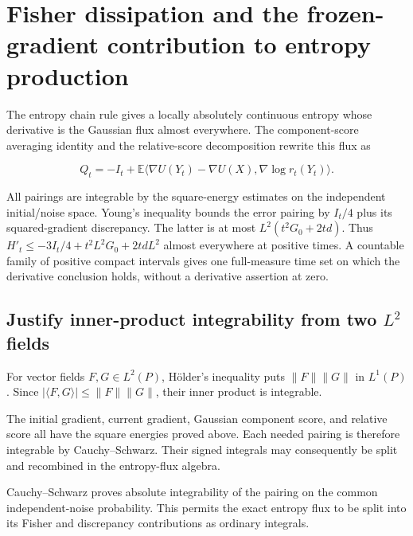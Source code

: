 \documentclass[11pt,a4paper]{report}
\begin{document}
\section{\texorpdfstring{Fisher dissipation and the frozen-gradient contribution to entropy production}{Fisher dissipation and the frozen-gradient contribution to entropy production}}
\label{proof-module-UnadjustedLangevin-LSI-GaussianEntropyProduction-lean}


The entropy chain rule gives a locally absolutely continuous entropy whose derivative is the Gaussian flux almost everywhere. The component-score averaging identity and the relative-score decomposition rewrite this flux as

\[Q_t=-I_t+\mathbb E\langle\nabla U(Y_t)-\nabla U(X),\nabla\log r_t(Y_t)\rangle.\]

All pairings are integrable by the square-energy estimates on the independent initial/\allowbreak{}noise space. Young's inequality bounds the error pairing by \(I_t/4\) plus its squared-gradient discrepancy. The latter is at most \(L^2(t^2G_0+2td)\). Thus \(H'_t\le-3I_t/4+t^2L^2G_0+2tdL^2\) almost everywhere at positive times. A countable family of positive compact intervals gives one full-measure time set on which the derivative conclusion holds, without a derivative assertion at zero.

\subsection{\texorpdfstring{Justify inner-product integrability from two \(L^2\) fields}{Justify inner-product integrability from two L² fields}}
\label{report-step-UnadjustedLangevin-LSI-GaussianEntropyProduction-lean-1}


For vector fields \(F,G\in L^2(P)\), Hölder's inequality puts \(\|F\|\|G\|\) in \(L^1(P)\). Since \(|\langle F,G\rangle|\le\|F\|\|G\|\), their inner product is integrable.



The initial gradient, current gradient, Gaussian component score, and relative score all have the square energies proved above. Each needed pairing is therefore integrable by Cauchy–Schwarz. Their signed integrals may consequently be split and recombined in the entropy-flux algebra.



Cauchy–Schwarz proves absolute integrability of the pairing on the common independent-noise probability. This permits the exact entropy flux to be split into its Fisher and discrepancy contributions as ordinary integrals.
\end{document}
